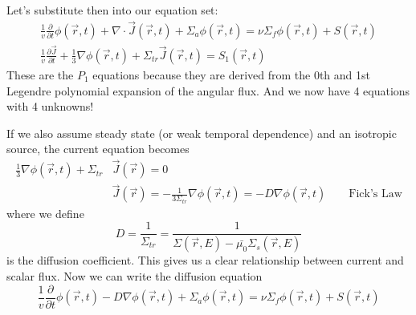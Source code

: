 \documentclass[12pt]{article}
\newcommand{\Macro}{\ensuremath{\Sigma}}
\begin{document}
Let's substitute then into our equation set:
%
\begin{align}
\frac{1}{v}\frac{\partial}{\partial t}\phi(\vec{r}, t) + 
\nabla \cdot \vec{J}(\vec{r}, t) + 
\Sigma_a \phi(\vec{r}, t) =
\nu \Sigma_f \phi(\vec{r}, t) +
S(\vec{r}, t) \\
%
\frac{1}{v}\frac{\partial \vec{J}}{\partial t} 
+ \frac{1}{3} \nabla \phi(\vec{r}, t) +
\Sigma_{tr}  \vec{J}(\vec{r}, t) =
S_{1}(\vec{r}, t) 
\end{align}
%
These are the $P_1$ equations because they are derived from the 0th and 1st Legendre polynomial expansion of the angular flux. And we now have 4 equations with 4 unknowns!

If we also assume steady state (or weak temporal dependence) and an isotropic source, the current equation becomes
%
\begin{align}
\frac{1}{3} \nabla \phi(\vec{r}, t) +
\Sigma_{tr}  &\vec{J}(\vec{r}) = 0 \\
&\boxed{\vec{J}(\vec{r}) = -\frac{1}{3\Sigma_{tr}} \nabla \phi(\vec{r}, t) = -D\nabla \phi(\vec{r}, t) } \qquad \text{Fick's Law}
\end{align}
%
where we define 
\[D = \frac{1}{\Macro_{tr}} = \frac{1}{\Macro(\vec{r},E) - \bar{\mu_{0}}\Macro_{s}(\vec{r},E)}\] 
is the diffusion coefficient. This gives us a clear relationship between current and scalar flux. Now we can write the diffusion equation
%
\begin{equation}
\boxed{\frac{1}{v}\frac{\partial}{\partial t}\phi(\vec{r}, t) -D\nabla \phi(\vec{r}, t) + 
\Sigma_a \phi(\vec{r}, t) =
\nu \Sigma_f \phi(\vec{r}, t) +
S(\vec{r}, t)}
\end{equation}






\end{document}
